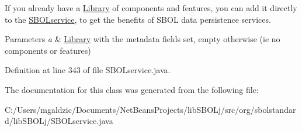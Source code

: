 If you already have a \hyperlink{classorg_1_1sbolstandard_1_1lib_s_b_o_lj_1_1_library}{Library} of components and features, you can add it directly to the \hyperlink{classorg_1_1sbolstandard_1_1lib_s_b_o_lj_1_1_s_b_o_lservice}{SBOLservice}, to get the benefits of SBOL data persistence services.


\begin{DoxyParams}{Parameters}
{\em a} & \hyperlink{classorg_1_1sbolstandard_1_1lib_s_b_o_lj_1_1_library}{Library} with the metadata fields set, empty otherwise (ie no components or features) \\
\hline
\end{DoxyParams}


Definition at line 343 of file SBOLservice.java.



The documentation for this class was generated from the following file:\begin{DoxyCompactItemize}
\item 
C:/Users/mgaldzic/Documents/NetBeansProjects/libSBOLj/src/org/sbolstandard/libSBOLj/SBOLservice.java\end{DoxyCompactItemize}
